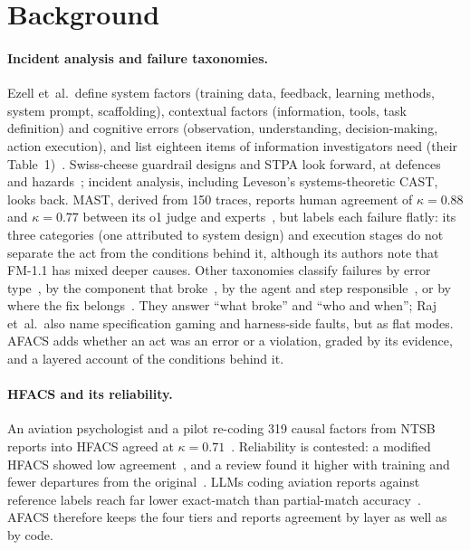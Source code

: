\documentclass[11pt]{article}
\begin{document}
\section{Background}

\paragraph{Incident analysis and failure taxonomies.} Ezell et~al.\ define system
factors (training data, feedback, learning methods, system prompt, scaffolding),
contextual factors (information, tools, task definition) and cognitive errors
(observation, understanding, decision-making, action execution), and list
eighteen items of information investigators need (their
Table~1)~\cite{ezell2025incident}. Swiss-cheese guardrail designs and STPA look
forward, at defences and hazards~\cite{shamsujjoha2024swisscheese,leveson2012engineering,mylius2025stpa};
incident analysis, including Leveson's systems-theoretic CAST, looks back. MAST, derived from 150 traces, reports human
agreement of $\kappa=0.88$ and $\kappa=0.77$ between its o1 judge and
experts~\cite{cemri2025mast}, but labels each failure flatly: its three categories
(one attributed to system design) and execution stages do not separate the act from
the conditions behind it, although its authors note that FM-1.1 has mixed deeper
causes. Other taxonomies classify
failures by error type~\cite{deshpande2025trail}, by the component that
broke~\cite{zhu2025agenterrorbench}, by the agent and step
responsible~\cite{zhang2025whowhen}, or by where the fix
belongs~\cite{raj2026modelharness}. They answer ``what broke'' and ``who and
when''; Raj et~al.\ also name specification gaming and harness-side faults, but as
flat modes. AFACS adds whether an act was an error or a violation, graded by its
evidence, and a layered account of the conditions behind it.

\paragraph{HFACS and its reliability.} An aviation psychologist and a pilot
re-coding 319 causal factors from NTSB reports into HFACS agreed at
$\kappa=0.71$~\cite{wiegmann2001commercial}. Reliability is contested: a modified
HFACS showed low agreement~\cite{olsen2010hfacsadf}, and a review found it higher
with training and fewer departures from the
original~\cite{cohen2015reliability}. LLMs coding aviation reports against
reference labels reach far lower exact-match than partial-match
accuracy~\cite{ahmadi2025hfacsgrpo}. AFACS therefore keeps the four tiers and
reports agreement by layer as well as by code.
\end{document}
